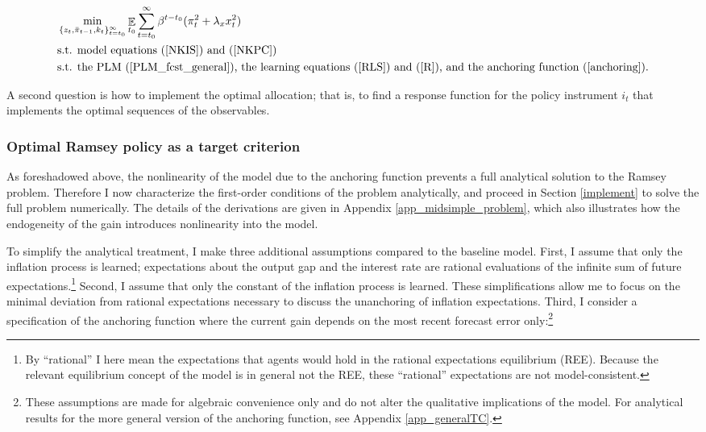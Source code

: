 \documentclass[11pt]{article}
\renewcommand{\[}{\begin{equation}}
\renewcommand{\]}{\end{equation}}
\DeclareMathOperator{\E}{\mathbb{E}}
\begin{document}
\begin{align*}
& \min_{ \{z_t, \bar{\pi}_{t-1}, k_t \}_{t=t_0}^{\infty}} \E_{t_0}\sum_{t=t_0}^{\infty} \beta^{t-t_0} (\pi_t^2  + \lambda_x x_t^2 )  \\
& \text{s.t. model equations (\ref{NKIS}) and (\ref{NKPC})} \\
& \text{s.t. the PLM (\ref{PLM_fcst_general}), the learning equations (\ref{RLS}) and (\ref{R}), and the anchoring function (\ref{anchoring})}. 
\end{align*}



A second question is how to implement the optimal allocation; that is, to find a response function for the policy instrument $i_t$ that implements the optimal sequences of the observables.


 


\subsubsection{Optimal Ramsey policy as a target criterion}

As foreshadowed above, the nonlinearity of the model due to the anchoring function prevents a full analytical solution to the Ramsey problem. Therefore I now characterize the first-order conditions of the problem analytically, and proceed in Section \ref{implement} to solve the full problem numerically. The details of the derivations are given in Appendix \ref{app_midsimple_problem}, which also illustrates how the endogeneity of the gain introduces nonlinearity into the model. 

To simplify the analytical treatment, I make three additional assumptions compared to the baseline model. First, I assume that only the inflation process is learned; expectations about the output gap and the interest rate are rational evaluations of the infinite sum of future expectations.\footnote{By ``rational'' I here mean the expectations that agents would hold in the rational expectations equilibrium (REE). Because the relevant equilibrium concept of the model is in general not the REE, these ``rational'' expectations are not model-consistent.}  Second, I assume that only the constant of the inflation process is learned. These simplifications allow me to focus on the minimal deviation from rational expectations necessary to discuss the unanchoring of inflation expectations. Third, I consider a specification of the anchoring function where the current gain depends on the most recent forecast error only:\footnote{These assumptions are made for algebraic convenience only and do not alter the qualitative implications of the model. For analytical results for the more general version of the anchoring function, see Appendix \ref{app_generalTC}.}
\end{document}
